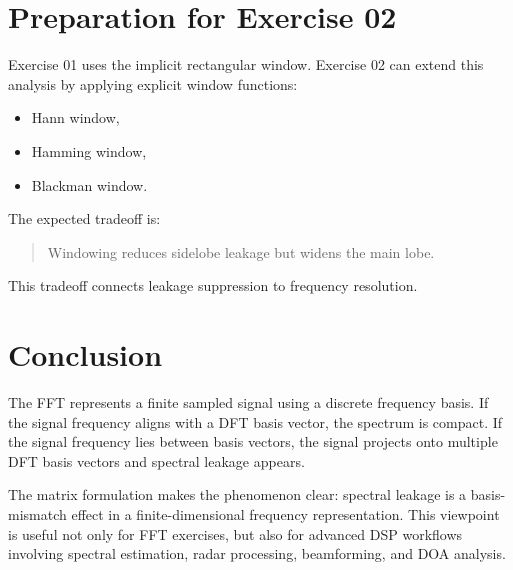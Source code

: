 ﻿\documentclass[11pt]{article}
\begin{document}
\section{Preparation for Exercise 02}

Exercise 01 uses the implicit rectangular window. Exercise 02 can extend this analysis by applying explicit window functions:

\begin{itemize}
\item Hann window,
\item Hamming window,
\item Blackman window.
\end{itemize}

The expected tradeoff is:

\begin{quote}
Windowing reduces sidelobe leakage but widens the main lobe.
\end{quote}

This tradeoff connects leakage suppression to frequency resolution.

\section{Conclusion}

The FFT represents a finite sampled signal using a discrete frequency basis. If the signal frequency aligns with a DFT basis vector, the spectrum is compact. If the signal frequency lies between basis vectors, the signal projects onto multiple DFT basis vectors and spectral leakage appears.

The matrix formulation makes the phenomenon clear: spectral leakage is a basis-mismatch effect in a finite-dimensional frequency representation. This viewpoint is useful not only for FFT exercises, but also for advanced DSP workflows involving spectral estimation, radar processing, beamforming, and DOA analysis.
\end{document}
